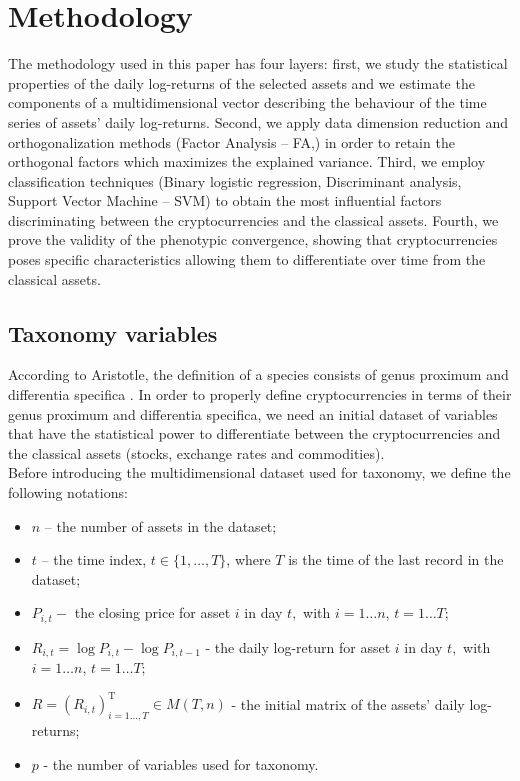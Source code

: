 \section{Methodology}

The methodology used in this paper has four layers: first, we study the statistical properties of the daily log-returns of the selected assets and we estimate the components of a multidimensional vector describing the behaviour of the time series of assets’ daily log-returns. Second, we apply data dimension reduction and orthogonalization methods (Factor Analysis – FA,) in order to retain the orthogonal factors which maximizes the explained variance. Third, we employ classification techniques (Binary logistic regression, Discriminant analysis, Support Vector Machine – SVM) to obtain the most influential factors discriminating between the cryptocurrencies and the classical assets. Fourth, we prove the validity of the phenotypic convergence, showing that cryptocurrencies poses specific characteristics allowing them to differentiate over time from the classical assets.
\subsection{Taxonomy variables}

According to Aristotle, the definition of a species consists of genus proximum and differentia specifica \citep{Parry.1991}. In order to properly define cryptocurrencies in terms of their genus proximum and differentia specifica, we need an initial dataset of variables that have the statistical power to differentiate between the cryptocurrencies and the classical assets (stocks, exchange rates and commodities).\\
Before introducing the multidimensional dataset used for taxonomy, we define the following notations:
\begin{itemize}
	\item $n$ – the number of assets in the dataset;
	\item $t$ – the time index, $t \in\{1, \ldots, T\}$, where $T$ is the time of the last record in the dataset;
	\item  $P_{i, t}-$ the closing price for asset $i$ in day $t,$ with $i=1\ldots n$,  $t=1 \ldots T$;
	 \item $R_{i, t}=\log P_{i, t}-\log P_{i, t-1}$ - the daily log-return for asset  $i$ in day $t,$ with $i=1\ldots n$,  $t=1 \ldots T$;
	 \item	$R=\left(R_{i, t}\right)_{i=1 \ldots, T}^{\mathrm{T}} \in M(T, n)$ - the initial matrix of the assets’ daily log-returns;
	 \item	$p$ - the number of variables used for taxonomy.
\end{itemize}

